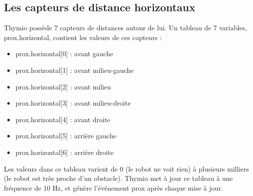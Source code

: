 \documentclass[a4paper, 12pt]{report}
\begin{document}
\subsection{Les capteurs de distance horizontaux}
Thymio possède 7 capteurs de distances autour de lui. Un tableau de 7 variables, prox.horizontal, contient les valeurs de ces capteurs :\\
\begin{itemize}
\item prox.horizontal[0] : avant gauche
\item prox.horizontal[1] : avant milieu-gauche
\item prox.horizontal[2] : avant milieu
\item prox.horizontal[3] : avant milieu-droite
\item prox.horizontal[4] : avant droite
\item prox.horizontal[5] : arrière gauche
\item prox.horizontal[6] : arrière droite
\end{itemize}
Les valeurs dans ce tableau varient de 0 (le robot ne voit rien) à plusieurs milliers (le robot est très proche d'un obstacle). Thymio met à jour ce tableau à une fréquence de 10 Hz, et génère l'événement prox après chaque mise à jour.

\end{document}
